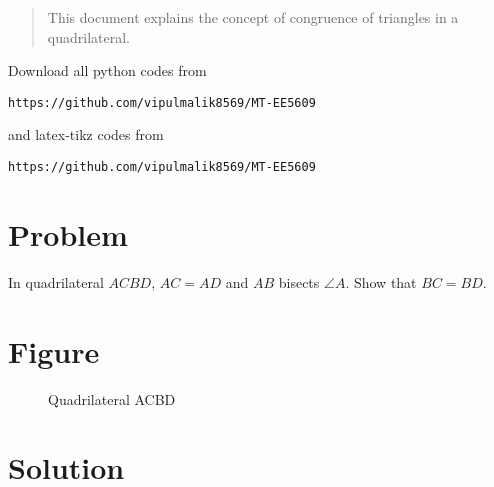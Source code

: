 \documentclass[journal,12pt,twocolumn]{IEEEtran}
\begin{document}
\date{\today}

\maketitle
\newpage
\bigskip
\renewcommand{\thefigure}{\theenumi}
\renewcommand{\thetable}{\theenumi}

\begin{abstract}
This document explains the concept of congruence of triangles in a quadrilateral.
\end{abstract}
Download all python codes from 
\begin{lstlisting}
https://github.com/vipulmalik8569/MT-EE5609
\end{lstlisting}
and latex-tikz codes from 
\begin{lstlisting}
https://github.com/vipulmalik8569/MT-EE5609
\end{lstlisting}
\section{\textbf{Problem}}
In quadrilateral $ACBD$, $AC = AD$ and $AB$ bisects $\angle{A}$. Show that $BC = BD$. 

\section{Figure}
\begin{figure}[!htb]
	\centering
    \centering
    \resizebox{\columnwidth}{!}{}
	\caption{Quadrilateral ACBD}
\end{figure}

\section{\textbf{Solution}}
\end{document}
